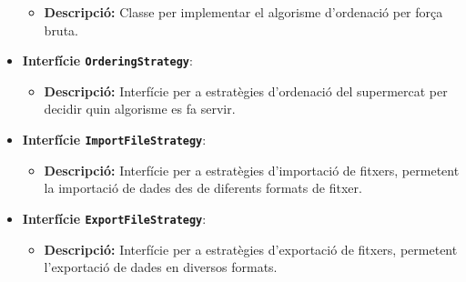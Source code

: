 \documentclass[a4paper,12pt]{report}
\begin{document}
\begin{itemize}
\begin{itemize}
			\item \textbf{Descripció:} Classe per implementar el algorisme d'ordenació per força bruta.
		\end{itemize}
		\item \textbf{Interfície \texttt{OrderingStrategy}}:
		\begin{itemize}
			\item \textbf{Descripció:} Interfície per a estratègies d'ordenació del supermercat per decidir quin algorisme es fa servir.
		\end{itemize}
		\item \textbf{Interfície \texttt{ImportFileStrategy}}:
		\begin{itemize}
			\item \textbf{Descripció:} Interfície per a estratègies d'importació de fitxers, permetent la importació de dades des de diferents formats de fitxer.
		\end{itemize}
		\item \textbf{Interfície \texttt{ExportFileStrategy}}:
		\begin{itemize}
			\item \textbf{Descripció:} Interfície per a estratègies d'exportació de fitxers, permetent l'exportació de dades en diversos formats.
		\end{itemize}
	\end{itemize}

\end{document}
